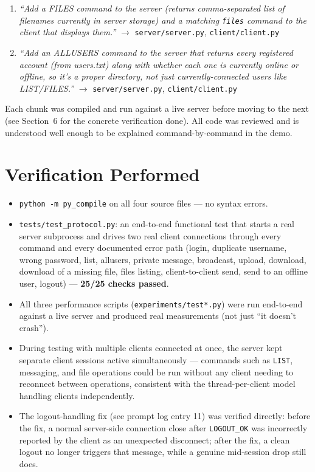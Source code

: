 \documentclass[11pt]{article}
\newcommand{\cmd}[1]{\texttt{#1}}
\begin{document}
\begin{enumerate}[leftmargin=1.7em]
\item \textit{``Add a FILES command to the server (returns
comma-separated list of filenames currently in server storage) and a
matching \texttt{files} command to the client that displays them.''}
$\to$ \cmd{server/server.py}, \cmd{client/client.py}

\item \textit{``Add an ALLUSERS command to the server that returns
every registered account (from users.txt) along with whether each one
is currently online or offline, so it's a proper directory, not just
currently-connected users like LIST/FILES.''} $\to$
\cmd{server/server.py}, \cmd{client/client.py}

\end{enumerate}

Each chunk was compiled and run against a live server before moving to
the next (see Section~6 for the concrete verification done). All code
was reviewed and is understood well enough to be explained
command-by-command in the demo.

\section{Verification Performed}

\begin{itemize}[leftmargin=1.5em]
  \item \cmd{python -m py\_compile} on all four source files --- no
        syntax errors.
  \item \cmd{tests/test\_protocol.py}: an end-to-end functional test
        that starts a real server subprocess and drives two real
        client connections through every command and every documented
        error path (login, duplicate username, wrong password, list,
        allusers, private message, broadcast, upload, download,
        download of a missing file, files listing, client-to-client
        send, send to an offline user, logout) --- \textbf{25/25
        checks passed}.
  \item All three performance scripts (\cmd{experiments/test*.py})
        were run end-to-end against a live server and produced real
        measurements (not just ``it doesn't crash'').
  \item During testing with multiple clients connected at once, the
        server kept separate client sessions active simultaneously ---
        commands such as \cmd{LIST}, messaging, and file operations
        could be run without any client needing to reconnect between
        operations, consistent with the thread-per-client model
        handling clients independently.
  \item The logout-handling fix (see prompt log entry 11) was verified
        directly: before the fix, a normal server-side connection close
        after \cmd{LOGOUT\_OK} was incorrectly reported by the client
        as an unexpected disconnect; after the fix, a clean logout no
        longer triggers that message, while a genuine mid-session drop
        still does.
\end{itemize}
\end{document}
